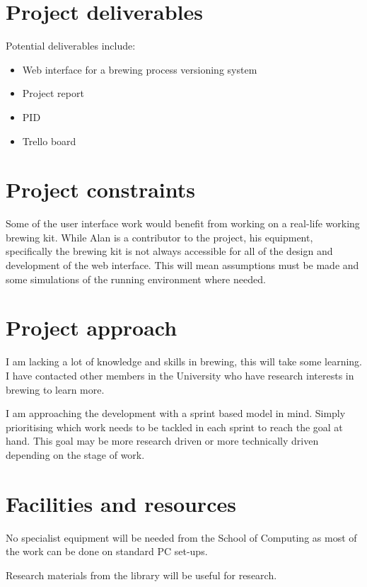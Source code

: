 \section{Project deliverables}

Potential deliverables include:

\begin{itemize}
    \item Web interface for a brewing process versioning system
    \item Project report
    \item PID
    \item Trello board
\end{itemize}

\section{Project constraints}

Some of the user interface work would benefit from working on a real-life working brewing kit. While Alan is a contributor to the project, his equipment, specifically the brewing kit is not always accessible for all of the design and development of the web interface. This will mean assumptions must be made and some simulations of the running environment where needed.

\section{Project approach}

I am lacking a lot of knowledge and skills in brewing, this will take some learning. I have contacted other members in the University who have research interests in brewing to learn more.

I am approaching the development with a sprint based model in mind. Simply prioritising which work needs to be tackled in each sprint to reach the goal at hand. This goal may be more research driven or more technically driven depending on the stage of work.

\section{Facilities and resources}

No specialist equipment will be needed from the School of Computing as most of the work can be done on standard PC set-ups.

Research materials from the library will be useful for research.

